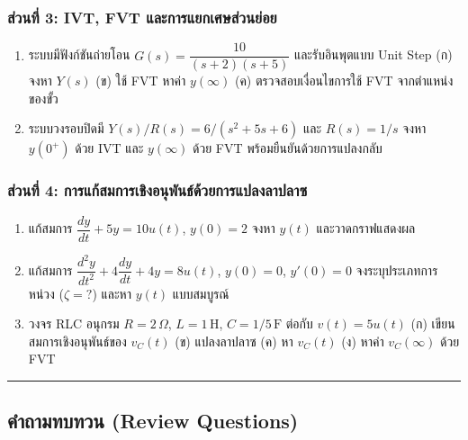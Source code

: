 \subsubsection{ส่วนที่ 3: IVT, FVT
และการแยกเศษส่วนย่อย}\label{uxe2auxe27uxe19uxe17-3-ivt-fvt-uxe41uxe25uxe30uxe01uxe32uxe23uxe41uxe22uxe01uxe40uxe28uxe29uxe2auxe27uxe19uxe22uxe2duxe22}

\begin{enumerate}
\def\labelenumi{\arabic{enumi}.}
\setcounter{enumi}{6}
\tightlist
\item
  ระบบมีฟังก์ชันถ่ายโอน \(G(s) = \dfrac{10}{(s+2)(s+5)}\) และรับอินพุตแบบ Unit
  Step (ก) จงหา \(Y(s)\) (ข) ใช้ FVT หาค่า \(y(\infty)\) (ค)
  ตรวจสอบเงื่อนไขการใช้ FVT จากตำแหน่งของขั้ว
\item
  ระบบวงรอบปิดมี \(Y(s)/R(s) = 6/(s^2+5s+6)\) และ \(R(s) = 1/s\) จงหา
  \(y(0^+)\) ด้วย IVT และ \(y(\infty)\) ด้วย FVT พร้อมยืนยันด้วยการแปลงกลับ
\end{enumerate}

\subsubsection{ส่วนที่ 4:
การแก้สมการเชิงอนุพันธ์ด้วยการแปลงลาปลาซ}\label{uxe2auxe27uxe19uxe17-4-uxe01uxe32uxe23uxe41uxe01uxe2auxe21uxe01uxe32uxe23uxe40uxe0auxe07uxe2duxe19uxe1euxe19uxe18uxe14uxe27uxe22uxe01uxe32uxe23uxe41uxe1buxe25uxe07uxe25uxe32uxe1buxe25uxe32uxe0b}

\begin{enumerate}
\def\labelenumi{\arabic{enumi}.}
\setcounter{enumi}{8}
\tightlist
\item
  แก้สมการ \(\dfrac{dy}{dt} + 5y = 10u(t)\), \(y(0) = 2\) จงหา
  \(y(t)\) และวาดกราฟแสดงผล
\item
  แก้สมการ \(\dfrac{d^2y}{dt^2} + 4\dfrac{dy}{dt} + 4y = 8u(t)\),
  \(y(0) = 0\), \(y'(0) = 0\) จงระบุประเภทการหน่วง (\(\zeta = ?\)) และหา
  \(y(t)\) แบบสมบูรณ์
\item
  วงจร RLC อนุกรม \(R=2\,\Omega\), \(L=1\,\text{H}\),
  \(C=1/5\,\text{F}\) ต่อกับ \(v(t) = 5u(t)\) (ก) เขียนสมการเชิงอนุพันธ์ของ
  \(v_C(t)\) (ข) แปลงลาปลาซ (ค) หา \(v_C(t)\) (ง) หาค่า \(v_C(\infty)\)
  ด้วย FVT
\end{enumerate}

\begin{center}\rule{0.5\linewidth}{0.5pt}\end{center}

\subsection{คำถามทบทวน (Review
Questions)}\label{uxe04uxe33uxe16uxe32uxe21uxe17uxe1auxe17uxe27uxe19-review-questions}

